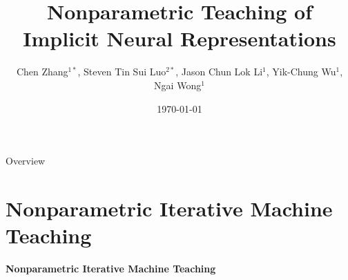 \documentclass[aspectratio=169,xcolor=dvipsnames]{beamer}
\title[short title]{Nonparametric Teaching of Implicit Neural Representations} %
\author{Chen Zhang$^{1 *}$, Steven Tin Sui Luo$^{2 *}$, Jason Chun Lok Li$^1$, Yik-Chung Wu$^1$, Ngai Wong$^1$}
\institute{$^1$The University of Hong Kong\newline$^2$The University of Toronto}
\date{\today} %
\begin{document}
\begin{frame}[plain]
    \titlepage
\end{frame}

\begin{frame}{Overview}
    \tableofcontents
\end{frame}


\section{Nonparametric Iterative Machine Teaching}
\begin{frame}
    \LARGE{\centerline{\textbf{Nonparametric Iterative Machine Teaching}}}
\end{frame}
\end{document}
